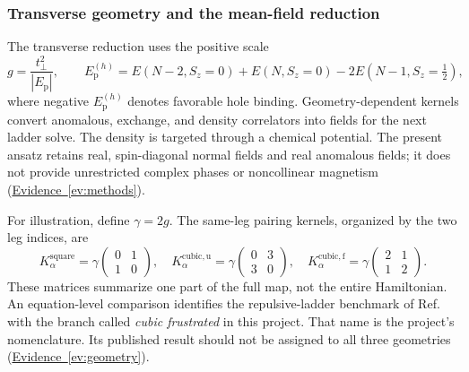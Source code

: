 \documentclass[11pt,letterpaper]{article}
\newcommand{\tp}{t_{\perp}}
\newcommand{\Ep}{E_{\mathrm p}}
\newcommand{\ev}[1]{\hyperref[ev:#1]{Evidence~\ref*{ev:#1}}}
\begin{document}
\subsubsection*{Transverse geometry and the mean-field reduction}
The transverse reduction uses the positive scale
\begin{equation}
 g=\frac{\tp^2}{|\Ep|},\qquad
 \Ep^{(h)}=E(N-2,S_z=0)+E(N,S_z=0)
                -2E(N-1,S_z=\tfrac12),
 \label{eq:kernel}
\end{equation}
where negative $\Ep^{(h)}$ denotes favorable hole binding. Geometry-dependent
kernels convert anomalous, exchange, and density correlators into fields for
the next ladder solve. The density is targeted through a chemical potential.
The present ansatz retains real, spin-diagonal normal fields and real
anomalous fields; it does not provide unrestricted complex phases or
noncollinear magnetism (\ev{methods}).

For illustration, define $\gamma=2g$. The same-leg pairing kernels, organized
by the two leg indices, are
\begin{equation}
 K_{\alpha}^{\mathrm{square}}=\gamma
 \begin{pmatrix}0&1\\1&0\end{pmatrix},\quad
 K_{\alpha}^{\mathrm{cubic,u}}=\gamma
 \begin{pmatrix}0&3\\3&0\end{pmatrix},\quad
 K_{\alpha}^{\mathrm{cubic,f}}=\gamma
 \begin{pmatrix}2&1\\1&2\end{pmatrix}.
 \label{eq:geometries}
\end{equation}
These matrices summarize one part of the full map, not the entire
Hamiltonian. An equation-level comparison identifies the repulsive-ladder
benchmark of Ref.~\citep{Bollmark2023} with the branch called
\emph{cubic frustrated} in this project. That name is the project's
nomenclature. Its published result should not be assigned to all three
geometries (\ev{geometry}).
\end{document}
